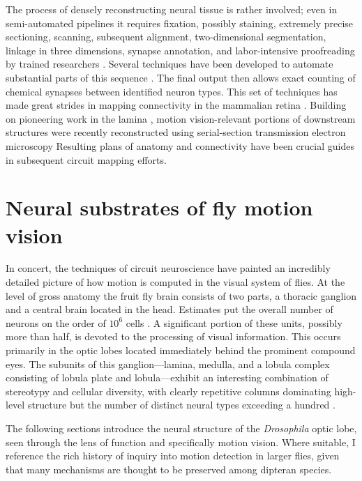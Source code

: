 The process of densely reconstructing neural tissue is rather involved; even in semi-automated pipelines it requires fixation, possibly staining, extremely precise sectioning, scanning, subsequent alignment, two-dimensional segmentation, linkage in three dimensions, synapse annotation, and labor-intensive proofreading by trained researchers \citep{Takemura:2015aa}. Several techniques have been developed to automate substantial parts of this sequence \citep{Denk:2004aa,Jain:2010ff}. The final output then allows exact counting of chemical synapses between identified neuron types. This set of techniques has made great strides in mapping connectivity in the mammalian retina \citep{Briggman:2011aa,Helmstaedter:2013iv,Kim:2014aa}. Building on pioneering work in the lamina \citep{Meinertzhagen:1991aa}, motion vision-relevant portions of downstream structures were recently reconstructed using serial-section transmission electron microscopy \citep[ssTEM;][]{Takemura:2008ee,Takemura:2011iy,Takemura:2013ea,RiveraAlba:2011dd,Shinomiya:2014dx}
Resulting plans of anatomy and connectivity have been crucial guides in subsequent circuit mapping efforts.

\section{Neural substrates of fly motion vision}
In concert, the techniques of circuit neuroscience have painted an incredibly detailed picture of how motion is computed in the visual system of flies. At the level of gross anatomy the fruit fly brain consists of two parts, a thoracic ganglion and a central brain located in the head. Estimates put the overall number of neurons on the order of $10^6$ cells \citep{Morante:2004aa}. A significant portion of these units, possibly more than half, is devoted to the processing of visual information. This occurs primarily in the optic lobes located immediately behind the prominent compound eyes. The subunits of this ganglion---lamina, medulla, and a lobula complex consisting of lobula plate and lobula---exhibit an interesting combination of stereotypy and cellular diversity, with clearly repetitive columns dominating high-level structure but the number of distinct neural types exceeding a hundred \citep{Fischbach:1989uw}.

The following sections introduce the neural structure of the \textit{Drosophila} optic lobe, seen through the lens of function and specifically motion vision. Where suitable, I reference the rich history of inquiry into motion detection in larger flies, given that many mechanisms are thought to be preserved among dipteran species.


